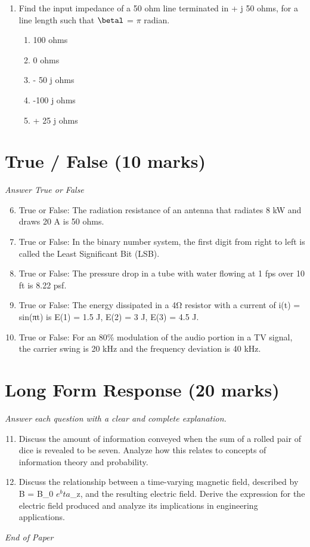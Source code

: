 \documentclass[12pt]{article}
\begin{document}
\begin{enumerate}[label=\arabic*.]
\begin{enumerate}[label=(\alph*)]
    \item 5/36
    \item 3/12
    \item 6/36
    \item 1/6
    \item 17/36
\end{enumerate}
\item Find the input impedance of a 50 ohm line terminated in + j 50 ohms, for a line length such that \ensuremath{\betal} = \ensuremath{\pi} radian.
\begin{enumerate}[label=(\alph*)]
    \item 100 ohms
    \item 0 ohms
    \item - 50 j ohms
    \item -100 j ohms
    \item + 25 j ohms
\end{enumerate}
\end{enumerate}

\section*{True / False (10 marks)}
\textit{Answer True or False}
\begin{enumerate}[label=\arabic*.]
\setcounter{enumi}{5}
\item True or False: The radiation resistance of an antenna that radiates 8 kW and draws 20 A is 50 ohms.
\item True or False: In the binary number system, the first digit from right to left is called the Least Significant Bit (LSB).
\item True or False: The pressure drop in a tube with water flowing at 1 fps over 10 ft is 8.22 psf.
\item True or False: The energy dissipated in a 4Ω resistor with a current of i(t) = sin(πt) is E(1) = 1.5 J, E(2) = 3 J, E(3) = 4.5 J.
\item True or False: For an 80\% modulation of the audio portion in a TV signal, the carrier swing is 20 kHz and the frequency deviation is 40 kHz.
\end{enumerate}

\section*{Long Form Response (20 marks)}
\textit{Answer each question with a clear and complete explanation.}
\begin{enumerate}[label=\arabic*.]
\setcounter{enumi}{10}
\item Discuss the amount of information conveyed when the sum of a rolled pair of dice is revealed to be seven. Analyze how this relates to concepts of information theory and probability.
\item Discuss the relationship between a time-varying magnetic field, described by B = B\_0 $e^bta$\_z, and the resulting electric field. Derive the expression for the electric field produced and analyze its implications in engineering applications.
\end{enumerate}

\vfill
\noindent\textit{End of Paper}
\end{document}

